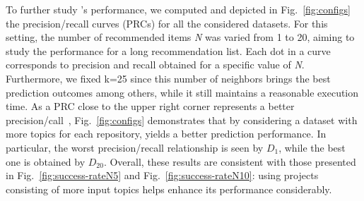 


To further study \TF's performance, we computed and depicted in Fig.~\ref{fig:configs} the precision/recall curves (PRCs) for all the considered datasets. 
For this setting, the number of recommended items \emph{N} was varied from 1 to 20, aiming to study the performance for a long recommendation list. Each dot in a curve corresponds to precision and recall obtained for a specific value of \emph{N}. Furthermore, we fixed k=25 since this number of neighbors brings the best prediction outcomes among others, while it still maintains a reasonable execution time. As a PRC close to the upper right corner represents a better precision/call~\cite{NGUYEN2020110460}, Fig.~\ref{fig:configs} demonstrates that by considering a dataset with more topics for each repository, \TFa yields a better prediction performance. In particular, the worst precision/recall relationship is seen by $D_{1}$, while the best one is obtained by $D_{20}$. Overall, these results are consistent with those presented in Fig.~\ref{fig:success-rateN5} and Fig.~\ref{fig:success-rateN10}: using projects consisting of more input topics helps \TFa enhance its performance considerably.


